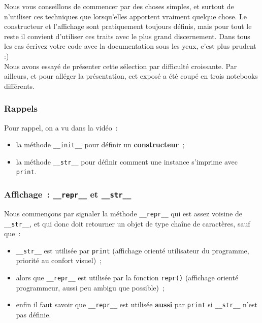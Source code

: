     Nous vous conseillons de commencer par des choses simples, et surtout de
n'utiliser ces techniques que lorsqu'elles apportent vraiment quelque
chose. Le constructeur et l'affichage sont pratiquement toujours
définis, mais pour tout le reste il convient d'utiliser ces traits avec
le plus grand discernement. Dans tous les cas écrivez votre code avec la
documentation sous les yeux, c'est plus prudent :)\\

    Nous avons essayé de présenter cette sélection par difficulté
croissante. Par ailleurs, et pour alléger la présentation, cet exposé a
été coupé en trois notebooks différents.


    \hypertarget{rappels}{%
\subsubsection{Rappels}\label{rappels}}

    Pour rappel, on a vu dans la vidéo~:

\begin{itemize}
\tightlist
\item
  la méthode \texttt{\_\_init\_\_} pour définir un
  \textbf{constructeur}~;
\item
  la méthode \texttt{\_\_str\_\_} pour définir comment une instance
  s'imprime avec \texttt{print}.
\end{itemize}

    \hypertarget{affichage-__repr__-et-__str__}{%
\subsubsection{\texorpdfstring{Affichage~: \texttt{\_\_repr\_\_} et
\texttt{\_\_str\_\_}}{Affichage~: \_\_repr\_\_ et \_\_str\_\_}}\label{affichage-__repr__-et-__str__}}

    Nous commençons par signaler la méthode \texttt{\_\_repr\_\_} qui est
assez voisine de \texttt{\_\_str\_\_}, et qui donc doit retourner un
objet de type chaîne de caractères, sauf que~:

\begin{itemize}
\tightlist
\item
  \texttt{\_\_str\_\_} est utilisée par \texttt{print} (affichage
  orienté utilisateur du programme, priorité au confort visuel)~;
\item
  alors que \texttt{\_\_repr\_\_} est utilisée par la fonction
  \texttt{repr()} (affichage orienté programmeur, aussi peu ambigu que
  possible)~;
\item
  enfin il faut savoir que \texttt{\_\_repr\_\_} est utilisée
  \textbf{aussi} par \texttt{print} si \texttt{\_\_str\_\_} n'est pas
  définie.
\end{itemize}

